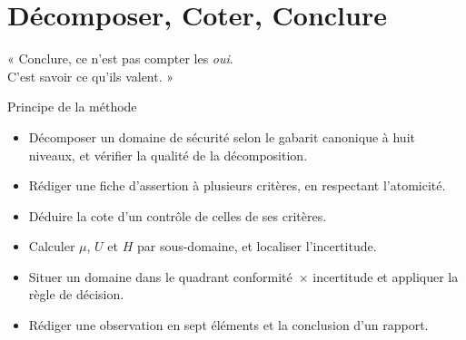 
\chapter{Décomposer, Coter, Conclure}
\label{chap:conclure}

\epigraph{%
    « Conclure, ce n'est pas compter les \emph{oui}.\\
    C'est savoir ce qu'ils valent. »%
}{Principe de la méthode}


\begin{boxobjectifs}
\begin{itemize}
    \item Décomposer un domaine de sécurité selon le gabarit canonique à
          huit niveaux, et vérifier la qualité de la décomposition.
    \item Rédiger une fiche d'assertion à plusieurs critères, en respectant
          l'atomicité.
    \item Déduire la cote d'un contrôle de celles de ses critères.
    \item Calculer $\mu$, $U$ et $H$ par sous-domaine, et localiser
          l'incertitude.
    \item Situer un domaine dans le quadrant conformité~$\times$ incertitude
          et appliquer la règle de décision.
    \item Rédiger une observation en sept éléments et la conclusion d'un
          rapport.
\end{itemize}
\end{boxobjectifs}

